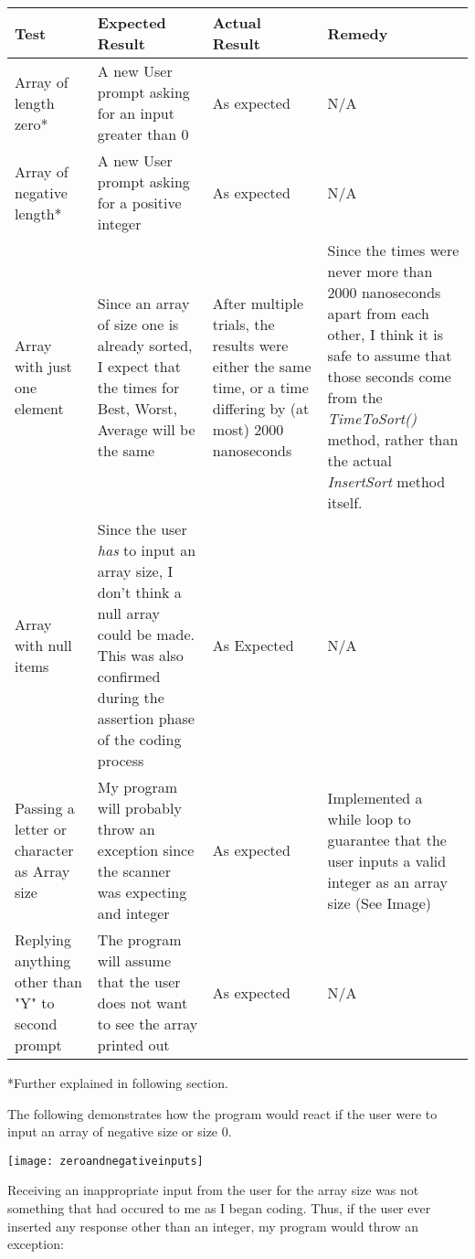 \documentclass[12pt]{article}
\begin{document}
	
	\begin{tabular}{|p{3.5cm}|p{3.5cm}|p{3.5cm}|p{3.5cm}|}
	\hline
	Test & Expected Result & Actual Result & Remedy\\
	\hline
	Array of length zero* & A new User prompt asking for an input greater than 0 & As expected & N/A\\
	\hline	
	Array of negative length* & A new User prompt asking for a positive integer & As expected & N/A\\
	\hline
	Array with just one element  & Since an array of size one is already sorted, I expect that the times for Best, Worst, Average will be the same & After multiple trials, the results were either the same time, or a time differing by (at most) 2000 nanoseconds & Since the times were never more than 2000 nanoseconds apart from each other, I think it is safe to assume that those seconds come from the \textit{TimeToSort()} method, rather than the actual \textit{InsertSort} method itself. \\
	\hline
	Array with null items  & Since the user \textit{has} to input an array size, I don't think a null array could be made. This was also confirmed during the assertion phase of the coding process & As Expected & N/A \\
	\hline
	Passing a letter or character as Array size & My program will probably throw an exception since the scanner was expecting and integer & As expected & Implemented a while loop to guarantee that the user inputs a valid integer as an array size (See Image) \\
	\hline
	Replying anything other than "Y" to second prompt & The program will assume that the user does not want to see the array printed out & As expected & N/A \\
	\hline
	\end{tabular}
	
	*Further explained in following section.
	
	\vspace*{.5in}
	The following demonstrates how the program would react if the user were to input an array of negative size or size 0.
	
	\texttt{[image: zeroandnegativeinputs]}
	\vspace*{.5in}
	
	Receiving an inappropriate input from the user for the array size was not something that had occured to me as I began coding. Thus, if the user ever inserted any response other than an integer, my program would throw an exception:
	
\end{document}
